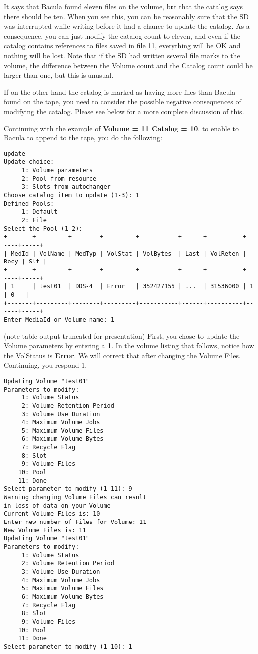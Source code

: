 It says that Bacula found eleven files on the volume, but that the catalog
says there should be ten. When you see this, you can be reasonably sure that
the SD was interrupted while writing before it had a chance to update the
catalog. As a consequence, you can just modify the catalog count to eleven,
and even if the catalog contains references to files saved in file 11,
everything will be OK and nothing will be lost. Note that if the SD had
written several file marks to the volume, the difference between the Volume
count and the Catalog count could be larger than one, but this is unusual. 

If on the other hand the catalog is marked as having more files than Bacula
found on the tape, you need to consider the possible negative consequences of
modifying the catalog. Please see below for a more complete discussion of
this. 

Continuing with the example of {\bf Volume = 11 Catalog = 10}, to enable to
Bacula to append to the tape, you do the following: 

\footnotesize
\begin{verbatim}
update
Update choice:
     1: Volume parameters
     2: Pool from resource
     3: Slots from autochanger
Choose catalog item to update (1-3): 1
Defined Pools:
     1: Default
     2: File
Select the Pool (1-2):
+-------+---------+--------+---------+-----------+------+----------+------+-----+
| MedId | VolName | MedTyp | VolStat | VolBytes  | Last | VolReten | Recy | Slt |
+-------+---------+--------+---------+-----------+------+----------+------+-----+
| 1     | test01  | DDS-4  | Error   | 352427156 | ...  | 31536000 | 1    | 0   |
+-------+---------+--------+---------+-----------+------+----------+------+-----+
Enter MediaId or Volume name: 1
\end{verbatim}
\normalsize

(note table output truncated for presentation) First, you chose to update the
Volume parameters by entering a {\bf 1}. In the volume listing that follows,
notice how the VolStatus is {\bf Error}. We will correct that after changing
the Volume Files. Continuing, you respond 1, 

\footnotesize
\begin{verbatim}
Updating Volume "test01"
Parameters to modify:
     1: Volume Status
     2: Volume Retention Period
     3: Volume Use Duration
     4: Maximum Volume Jobs
     5: Maximum Volume Files
     6: Maximum Volume Bytes
     7: Recycle Flag
     8: Slot
     9: Volume Files
    10: Pool
    11: Done
Select parameter to modify (1-11): 9
Warning changing Volume Files can result
in loss of data on your Volume
Current Volume Files is: 10
Enter new number of Files for Volume: 11
New Volume Files is: 11
Updating Volume "test01"
Parameters to modify:
     1: Volume Status
     2: Volume Retention Period
     3: Volume Use Duration
     4: Maximum Volume Jobs
     5: Maximum Volume Files
     6: Maximum Volume Bytes
     7: Recycle Flag
     8: Slot
     9: Volume Files
    10: Pool
    11: Done
Select parameter to modify (1-10): 1
\end{verbatim}
\normalsize

